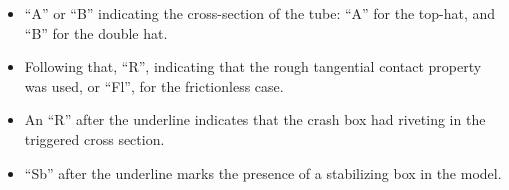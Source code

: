 \documentclass[
documentsize = a4, %
font = cmr, %
typesize = 11, %
printmode = true,
onehalfspacing = true,
language = en, %
titlepage = udciccp, %
degree = pt, %
dedication = true,
acknowledgements = true,
abstract-en = true,
abstract-es = false,
abstract-ga = false,
epigraphs = true,
toc = true,
lof = true,
lot = true,
frontmatterintoc = false,
notation = false,
minimal = false,
]{UDCthesis}
\begin{document}
\begin{itemize}
	\item ``A'' or ``B'' indicating the cross-section of the tube: ``A'' for the top-hat, and ``B'' for the double hat.

	\item Following that, ``R'', indicating that the rough tangential contact property was used, or ``Fl'', for the frictionless case.

	\item An ``R'' after the underline indicates that the crash box had riveting in the triggered cross section.

	\item ``Sb'' after the underline marks the presence of a stabilizing box in the model.
\end{itemize}
\end{document}
